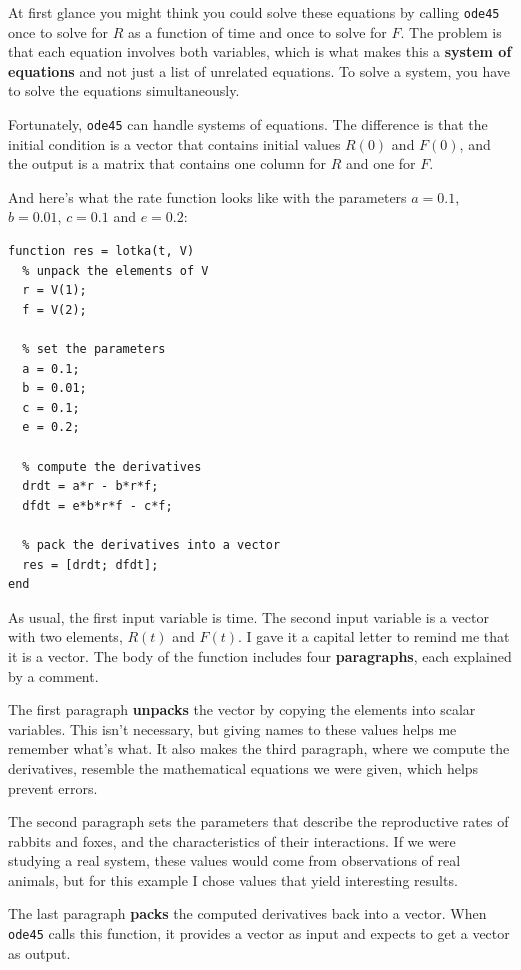 At first glance you might think you could solve these equations by
calling {\tt ode45} once to solve for $R$ as a function of time and
once to solve for $F$. The problem is that each equation involves
both variables, which is what makes this a {\bf system of equations}
and not just a list of unrelated equations. To solve a system, you
have to solve the equations simultaneously.

Fortunately, {\tt ode45} can handle systems of equations. The
difference is that the initial condition is a vector that contains
initial values $R(0)$ and $F(0)$, and the output is a matrix
that contains one column for $R$ and one for $F$.

And here's what the rate function looks like
with the parameters $a = 0.1$, $b = 0.01$, $c = 0.1$ and $e = 0.2$:

\begin{verbatim}
function res = lotka(t, V)
  % unpack the elements of V
  r = V(1);
  f = V(2);

  % set the parameters
  a = 0.1;
  b = 0.01;
  c = 0.1;
  e = 0.2;
  
  % compute the derivatives
  drdt = a*r - b*r*f;
  dfdt = e*b*r*f - c*f;
  
  % pack the derivatives into a vector
  res = [drdt; dfdt];
end
\end{verbatim}

As usual, the first input variable is time.
The second input variable is a vector with two elements,
$R(t)$ and $F(t)$. I gave it a capital letter to remind me that it
is a vector. The body of the function includes four {\bf paragraphs},
each explained by a comment.

The first paragraph {\bf unpacks} the vector by copying the elements
into scalar variables. This isn't necessary, but giving names to
these values helps me remember what's what. It also makes the third
paragraph, where we compute the derivatives, resemble the mathematical
equations we were given, which helps prevent errors.

The second paragraph sets the parameters that describe the
reproductive rates of rabbits and foxes, and the characteristics of
their interactions. If we were studying a real system, these values
would come from observations of real animals, but for this example
I chose values that yield interesting results.

The last paragraph {\bf packs} the computed derivatives back into a
vector. When {\tt ode45} calls this function, it provides a vector
as input and expects to get a vector as output.

